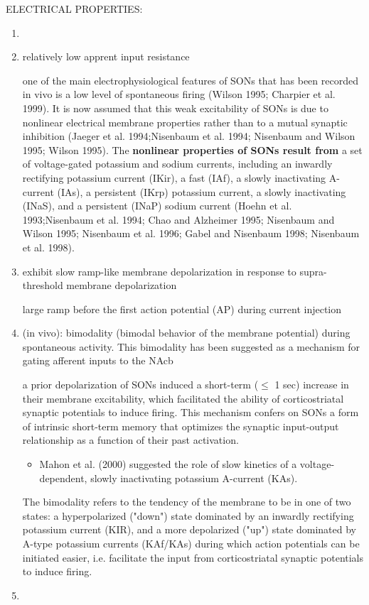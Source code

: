 ELECTRICAL PROPERTIES:
\begin{enumerate}
  
  \item 
  
  \item relatively low apprent input resistance
  
  one of the main electrophysiological features of SONs that has been recorded
  in vivo is a low level of spontaneous firing (Wilson 1995; Charpier et al.
  1999).
  It is now assumed that this weak excitability of SONs is due to nonlinear
  electrical membrane properties rather than to a mutual synaptic inhibition
  (Jaeger et al. 1994;Nisenbaum et al. 1994; Nisenbaum and Wilson 1995; Wilson
  1995). The {\bf nonlinear properties of SONs result from} a set of
  voltage-gated potassium and sodium currents, including an inwardly rectifying potassium
  current (IKir), a fast (IAf), a slowly inactivating A-current (IAs), a
  persistent (IKrp) potassium current, a slowly inactivating (INaS), and a
  persistent (INaP) sodium current (Hoehn et al. 1993;Nisenbaum et al. 1994;
  Chao and Alzheimer 1995; Nisenbaum and Wilson 1995; Nisenbaum et al. 1996;
  Gabel and Nisenbaum 1998; Nisenbaum et al. 1998).
  
  
  \item exhibit slow ramp-like membrane depolarization in response to
  supra-threshold membrane depolarization
  
 large ramp before the first action potential (AP) during current
  injection
 
 
  \item (in vivo): bimodality (bimodal behavior of the membrane
potential) during spontaneous activity. This bimodality has been suggested as a mechanism for
gating afferent inputs to the NAcb
  
  a prior depolarization of SONs induced a short-term ($\le$ 1 sec) increase in
  their membrane excitability, which facilitated the ability of corticostriatal
  synaptic potentials to induce firing.
  This mechanism confers on SONs a form of intrinsic short-term memory that
  optimizes the synaptic input-output relationship as a function of their past activation.
  \begin{itemize}
    \item Mahon et al. (2000) suggested the role of slow kinetics of a
    voltage-dependent, slowly inactivating potassium A-current (KAs).
  \end{itemize}
  
  The bimodality refers to the tendency of the membrane to be in one of two
  states: a hyperpolarized ("down") state dominated by an inwardly rectifying
  potassium current (KIR), and a more depolarized ("up") state dominated by
  A-type potassium currents (KAf/KAs) during which action potentials can be
  initiated easier, i.e. facilitate the input from corticostriatal synaptic
  potentials to induce firing.

  \item 
\end{enumerate}

